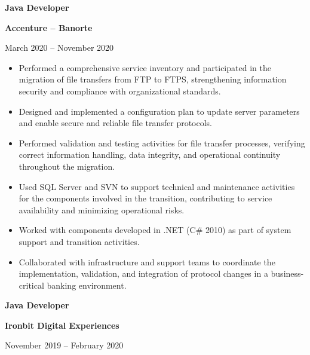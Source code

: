 \documentclass[10pt,letterpaper]{article}
\newcommand{\jobtitle}[1]{
    {\bfseries #1}
}
\newcommand{\company}[1]{
    {\bfseries\color{DarkGray} #1}
}
\newcommand{\jobdate}[1]{
    {\color{MediumGray} #1}
}
\begin{document}

\jobtitle{Java Developer} \textbar{}
\company{Accenture -- Banorte}
\hfill \textbar{}
\jobdate{March 2020 -- November 2020}

\begin{itemize}

    \item Performed a comprehensive service inventory and participated in the migration of file transfers from FTP to FTPS, strengthening information security and compliance with organizational standards.

    \item Designed and implemented a configuration plan to update server parameters and enable secure and reliable file transfer protocols.

    \item Performed validation and testing activities for file transfer processes, verifying correct information handling, data integrity, and operational continuity throughout the migration.

    \item Used SQL Server and SVN to support technical and maintenance activities for the components involved in the transition, contributing to service availability and minimizing operational risks.

    \item Worked with components developed in .NET (C\# 2010) as part of system support and transition activities.

    \item Collaborated with infrastructure and support teams to coordinate the implementation, validation, and integration of protocol changes in a business-critical banking environment.

\end{itemize}


\jobtitle{Java Developer} \textbar{}
\company{Ironbit Digital Experiences}
\hfill \textbar{}
\jobdate{November 2019 -- February 2020}
\end{document}
